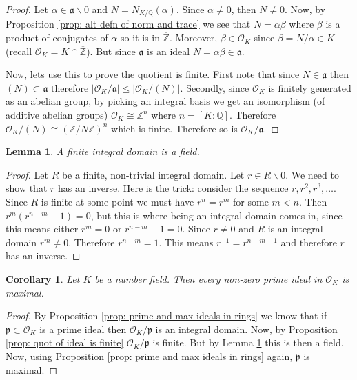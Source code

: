 \documentclass[11pt,a4paper]{report}
\theoremstyle{plain}
\newtheorem{lem}[subsection]{Lemma}
\newtheorem{cor}[subsection]{Corollary}
\theoremstyle{definition}
\theoremstyle{definition}
\newcommand{\ZZ}{\mathbb{Z}}
\def\QQ{\mathbb{Q}}
\def \Nm {N_{K/\QQ}}
\def\gothp{\mathfrak{p}}
\def \a{\alpha}
\def \OO {\mathcal{O}}
\def \ov{\overline}
\def\gotha{\mathfrak{a}}
\begin{document}
\begin{proof}
Let $\a \in \gotha \backslash 0$ and $N=\Nm(\a)$. Since $\a \neq 0$, then $N \neq 0$. Now, by Proposition \ref{prop: alt defn of norm and trace} we see that $N=\a \beta$ where $\beta$ is a product of conjugates of $\a$ so it is in $\ov{\ZZ}$. Moreover, $\beta \in \OO_K$ since $\beta=N/\a \in K$ (recall $\OO_K=K \cap \ov{\ZZ}$). But since $\gotha$ is an ideal $N=\a \beta \in \gotha$.

Now, lets use this to prove the quotient is finite. First note that since $N \in \gotha$ then $(N) \subset \gotha$ therefore $|\OO_K /\gotha| \leq |\OO_K / (N)|$. Secondly, since $\OO_K$ is finitely generated as an abelian group, by picking an integral basis we get an isomorphism (of additive abelian groups) $\OO_K \cong \ZZ^n$ where $n=[K:\QQ]$. Therefore $\OO_K/(N) \cong (\ZZ/N\ZZ)^n$ which is finite. Therefore so is $\OO_K/\gotha$.
\end{proof}



\begin{lem}\label{lem: fin int dom is field}
A finite integral domain is a field.
\end{lem}


\begin{proof}
Let $R$ be a finite, non-trivial integral domain. Let $r \in R\backslash 0$. We need to show that $r$ has an inverse. Here is the trick: consider the sequence $r,r^2,r^3,\dots.$ Since $R$ is finite at some point we must have $r^n=r^m$ for some $m<n$. Then $r^m(r^{n-m}-1)=0$, but this is where being an integral domain comes in, since this means either $r^m=0$ or $r^{n-m}-1=0$. Since $r \neq 0$ and $R$ is an integral domain $r^m \neq 0$. Therefore $r^{n-m}=1$. This means $r^{-1}=r^{n-m-1}$ and therefore $r$ has an inverse.
\end{proof}

\begin{cor}\label{cor: prim ideal is maximal}
Let $K$ be a number field. Then every non-zero prime ideal in $\OO_K$ is maximal.
\end{cor}

\begin{proof}
By Proposition \ref{prop: prime and max ideals in rings} we know that if $\gothp \subset \OO_K$ is a prime ideal then $\OO_K/\gothp$ is an integral domain. Now, by Proposition \ref{prop: quot of ideal is finite} $\OO_K /\gothp$ is finite. But by Lemma \ref{lem: fin int dom is field} this is then a field. Now, using Proposition \ref{prop: prime and max ideals in rings} again, $\gothp$ is maximal.
\end{proof}
\end{document}
